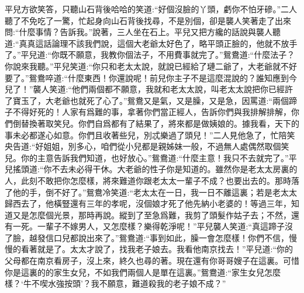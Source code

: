 \begin{parag}
    平兒方欲笑答，只聽山石背後哈哈的笑道:“好個沒臉的丫頭，虧你不怕牙磣。”二人聽了不免吃了一驚，忙起身向山石背後找尋，不是別個，卻是襲人笑著走了出來問:“什麼事情？告訴我。”說著，三人坐在石上。平兒又把方纔的話說與襲人聽道:“真真這話論理不該我們說，這個大老爺太好色了，略平頭正臉的，他就不放手了。”平兒道:“你既不願意，我教你個法子，不用費事就完了。”鴛鴦道:“什麼法子？你說來我聽。”平兒笑道:“你只和老太太說，就說已經給了璉二爺了，大老爺就不好要了。”鴛鴦啐道:“什麼東西！你還說呢！前兒你主子不是這麼混說的？誰知應到今兒了！”襲人笑道:“他們兩個都不願意，我就和老太太說，叫老太太說把你已經許了寶玉了，大老爺也就死了心了。”鴛鴦又是氣，又是臊，又是急，因罵道:“兩個蹄子不得好死的！人家有爲難的事，拿著你們當正經人，告訴你們與我排解排解，你們倒替換著取笑兒。你們自爲都有了結果了，將來都是做姨娘的。據我看，天下的事未必都遂心如意。你們且收著些兒，別忒樂過了頭兒！”二人見他急了，忙陪笑央告道:“好姐姐，別多心，咱們從小兒都是親姊妹一般，不過無人處偶然取個笑兒。你的主意告訴我們知道，也好放心。”鴛鴦道:“什麼主意！我只不去就完了。”平兒搖頭道:“你不去未必得干休。大老爺的性子你是知道的。雖然你是老太太房裏的人，此刻不敢把你怎麼樣，將來難道你跟老太太一輩子不成？也要出去的。那時落了他的手，倒不好了。”鴛鴦冷笑道:“老太太在一日，我一日不離這裏；若是老太太歸西去了，他橫豎還有三年的孝呢，沒個娘才死了他先納小老婆的！等過三年，知道又是怎麼個光景，那時再說。縱到了至急爲難，我剪了頭髮作姑子去；不然，還有一死。一輩子不嫁男人，又怎麼樣？樂得乾淨呢！”平兒襲人笑道:“真這蹄子沒了臉，越發信口兒都說出來了。”鴛鴦道:“事到如此，臊一會怎麼樣！你們不信，慢慢的看著就是了。太太才說了，找我老子娘去。我看他南京找去！”平兒道:“你的父母都在南京看房子，沒上來，終久也尋的著。現在還有你哥哥嫂子在這裏。可惜你是這裏的的家生女兒，不如我們兩個人是單在這裏。”鴛鴦道:“家生女兒怎麼樣？‘牛不喫水強按頭’？我不願意，難道殺我的老子娘不成？”
\end{parag}


